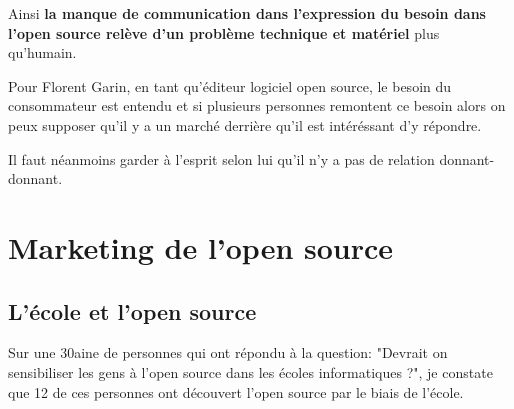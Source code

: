 			Ainsi \textbf{la manque de communication dans l'expression du besoin dans l'open source relève d'un problème technique et matériel} plus qu'humain.

			\newpage

			Pour Florent Garin, en tant qu'éditeur logiciel open source, le besoin du consommateur est entendu et si plusieurs personnes remontent ce besoin alors on peux supposer qu'il y a un marché derrière qu'il est intéréssant d'y répondre.

			Il faut néanmoins garder à l'esprit selon lui qu'il n'y a pas de relation donnant-donnant.

			\begin{center}
				\textit{
				}
			\end{center}


	\section{Marketing de l'open source}

		\subsection{L'école et l'open source}

			Sur une 30aine de personnes qui ont répondu à la question: "Devrait on sensibiliser les gens à l'open source dans les écoles informatiques ?", je constate que 12 de ces personnes ont découvert l'open source par le biais de l'école.

